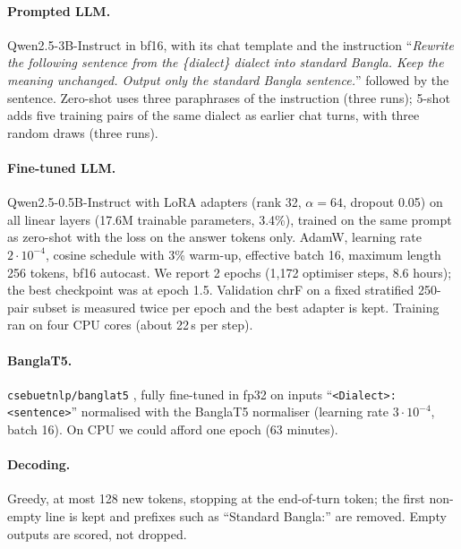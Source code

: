 \documentclass[10pt,twocolumn]{article}
\begin{document}
\paragraph{Prompted LLM.} Qwen2.5-3B-Instruct \cite{qwen} in bf16, with its chat template and the
instruction ``\emph{Rewrite the following sentence from the \{dialect\} dialect into standard Bangla. Keep the
meaning unchanged. Output only the standard Bangla sentence.}'' followed by the sentence. Zero-shot uses three
paraphrases of the instruction (three runs); 5-shot adds five training pairs of the same dialect as earlier
chat turns, with three random draws (three runs).

\paragraph{Fine-tuned LLM.} Qwen2.5-0.5B-Instruct with LoRA adapters (rank 32, $\alpha=64$, dropout 0.05) on
all linear layers (17.6M trainable parameters, 3.4\%), trained on the same prompt as zero-shot with the loss
on the answer tokens only. AdamW, learning rate $2\cdot10^{-4}$, cosine schedule with 3\% warm-up,
effective batch 16, maximum length 256 tokens, bf16 autocast. We report 2 epochs (1,172 optimiser steps, 8.6 hours); the best checkpoint was at epoch 1.5. Validation chrF on a fixed
stratified 250-pair subset is measured twice per epoch and the best adapter is kept. Training ran on four CPU
cores (about 22\,s per step).

\paragraph{BanglaT5.} \texttt{csebuetnlp/banglat5} \cite{banglat5}, fully fine-tuned in fp32 on inputs
``\texttt{<Dialect>: <sentence>}'' normalised with the BanglaT5 normaliser (learning rate $3\cdot10^{-4}$,
batch 16). On CPU we could afford one epoch (63 minutes).

\paragraph{Decoding.} Greedy, at most 128 new tokens, stopping at the end-of-turn token; the first non-empty
line is kept and prefixes such as ``Standard Bangla:'' are removed. Empty outputs are scored, not dropped.
\end{document}
